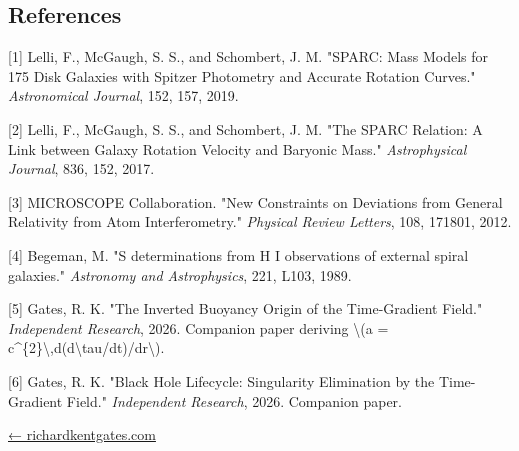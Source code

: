 \documentclass[
  10pt,
]{article}
\begin{document}
\hypertarget{references}{%
\subsection{References}\label{references}}

{[}1{]} Lelli, F., McGaugh, S. S., and Schombert, J. M. "SPARC: Mass
Models for 175 Disk Galaxies with Spitzer Photometry and Accurate
Rotation Curves." \emph{Astronomical Journal}, 152, 157, 2019.

{[}2{]} Lelli, F., McGaugh, S. S., and Schombert, J. M. "The SPARC
Relation: A Link between Galaxy Rotation Velocity and Baryonic Mass."
\emph{Astrophysical Journal}, 836, 152, 2017.

{[}3{]} MICROSCOPE Collaboration. "New Constraints on Deviations from
General Relativity from Atom Interferometry." \emph{Physical Review
Letters}, 108, 171801, 2012.

{[}4{]} Begeman, M. "S determinations from H I observations of external
spiral galaxies." \emph{Astronomy and Astrophysics}, 221, L103, 1989.

{[}5{]} Gates, R. K. "The Inverted Buoyancy Origin of the Time-Gradient
Field." \emph{Independent Research}, 2026. Companion paper deriving
\textbackslash(a =
c\^{}\{2\}\textbackslash,d(d\textbackslash tau/dt)/dr\textbackslash).

{[}6{]} Gates, R. K. "Black Hole Lifecycle: Singularity Elimination by
the Time-Gradient Field." \emph{Independent Research}, 2026. Companion
paper.

\href{https://richardkentgates.com/}{← richardkentgates.com}
\end{document}
